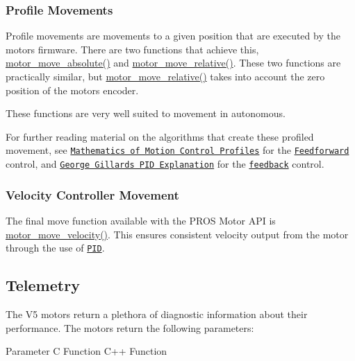 \subsubsection*{Profile Movements}

Profile movements are movements to a given position that are executed by the motor\textquotesingle{}s firmware. There are two functions that achieve this, {\ttfamily \hyperlink{motors_8h_ab70bf4937f1b5cefa15c11c15314c90e}{motor\+\_\+move\+\_\+absolute()}} and {\ttfamily \hyperlink{motors_8h_ab4c1ba35d69e8e9b49df0e848fa305d3}{motor\+\_\+move\+\_\+relative()}}. These two functions are practically similar, but {\ttfamily \hyperlink{motors_8h_ab4c1ba35d69e8e9b49df0e848fa305d3}{motor\+\_\+move\+\_\+relative()}} takes into account the zero position of the motor\textquotesingle{}s encoder.

These functions are very well suited to movement in autonomous.

For further reading material on the algorithms that create these profiled movement, see \href{https://pdfs.semanticscholar.org/a229/fdba63d8d68abd09f70604d56cc07ee50f7d.pdf}{\tt Mathematics of Motion Control Profiles} for the \href{https://en.wikipedia.org/wiki/Feed_forward_(control)}{\tt Feedforward} control, and \href{http://georgegillard.com/documents/2-introduction-to-pid-controllers}{\tt George Gillard\textquotesingle{}s P\+ID Explanation} for the \href{https://en.wikipedia.org/wiki/Control_theory#PID_feedback_control}{\tt feedback} control.

\subsubsection*{Velocity Controller Movement}

The final {\ttfamily move} function available with the P\+R\+OS Motor A\+PI is {\ttfamily \hyperlink{motors_8h_a5a366399c1ff416002641fd05e6d7808}{motor\+\_\+move\+\_\+velocity()}}. This ensures consistent velocity output from the motor through the use of \href{http://georgegillard.com/documents/2-introduction-to-pid-controllers}{\tt P\+ID}.

\subsection*{Telemetry}

The V5 motors return a plethora of diagnostic information about their performance. The motors return the following parameters\+:

Parameter C Function C++ Function 



